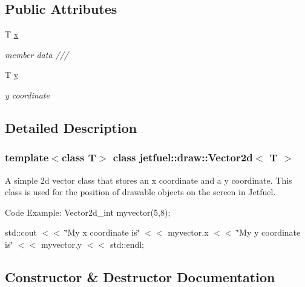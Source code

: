 \subsection*{Public Attributes}
\begin{DoxyCompactItemize}
\item 
T \hyperlink{classjetfuel_1_1draw_1_1Vector2d_a1d0f2b544d0e746ca64b9c431fd4c8f1}{x}
\begin{DoxyCompactList}\small\item\em member data /// \end{DoxyCompactList}\item 
\mbox{\label{classjetfuel_1_1draw_1_1Vector2d_ae826e7bcc14c0095c2a115ef801386ec}} 
T \hyperlink{classjetfuel_1_1draw_1_1Vector2d_ae826e7bcc14c0095c2a115ef801386ec}{y}
\begin{DoxyCompactList}\small\item\em y coordinate \end{DoxyCompactList}\end{DoxyCompactItemize}


\subsection{Detailed Description}
\subsubsection*{template$<$class T$>$\newline
class jetfuel\+::draw\+::\+Vector2d$<$ T $>$}

A simple 2d vector class that stores an x coordinate and a y coordinate. This class is used for the position of drawable objects on the screen in Jetfuel.

Code Example\+: Vector2d\+\_\+int myvector(5,8);

std\+::cout $<$$<$ \char`\"{}\+My x coordinate is\char`\"{} $<$$<$ myvector.\+x $<$$<$ \char`\"{}\+My y coordinate is\char`\"{} $<$$<$ myvector.\+y $<$$<$ std\+::endl; 

\subsection{Constructor \& Destructor Documentation}
\mbox{\label{classjetfuel_1_1draw_1_1Vector2d_a99950184603c690d3f73753ff3a6500a}} 
